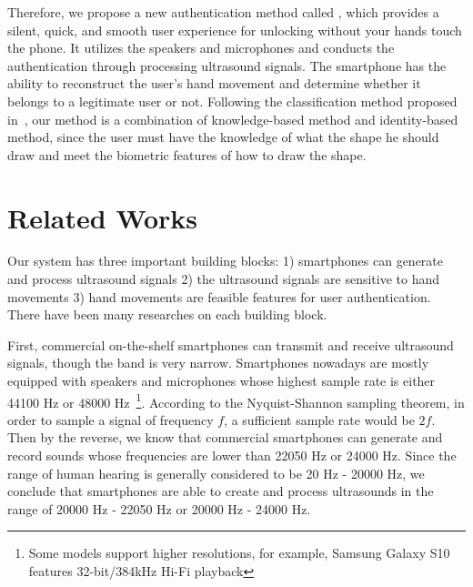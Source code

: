 Therefore, we propose a new authentication method called {\uu}, which provides a silent, quick, and smooth user experience for unlocking without your hands touch the phone. It utilizes the speakers and microphones and conducts the authentication through processing ultrasound signals. The smartphone has the ability to reconstruct the user’s hand movement and determine whether it belongs to a legitimate user or not. Following the classification method proposed in~\cite{vongsingthong2015survey}, our method is a combination of knowledge-based method and identity-based method, since the user must have the knowledge of what the shape he should draw and meet the biometric features of how to draw the shape.

\section{Related Works}
Our {\uu} system has three important building blocks: 1) smartphones can generate and process ultrasound signals 2) the ultrasound signals are sensitive to hand movements 3) hand movements are feasible features for user authentication. There have been many researches on each building block.

First, commercial on-the-shelf smartphones can transmit and receive ultrasound signals, though the band is very narrow. Smartphones nowadays are mostly equipped with speakers and microphones whose highest sample rate is either 44100 Hz or 48000 Hz~\footnote{Some models support higher resolutions, for example, Samsung Galaxy S10 features 32-bit/384kHz Hi-Fi playback}. According to the Nyquist-Shannon sampling theorem, in order to sample a signal of frequency $f$, a sufficient sample rate would be $2f$. Then by the reverse, we know that commercial smartphones can generate and record sounds whose frequencies are lower than 22050 Hz or 24000 Hz. Since the range of human hearing is generally considered to be 20 Hz - 20000 Hz, we conclude that smartphones are able to create and process ultrasounds in the range of 20000 Hz - 22050 Hz or 20000 Hz - 24000 Hz.

